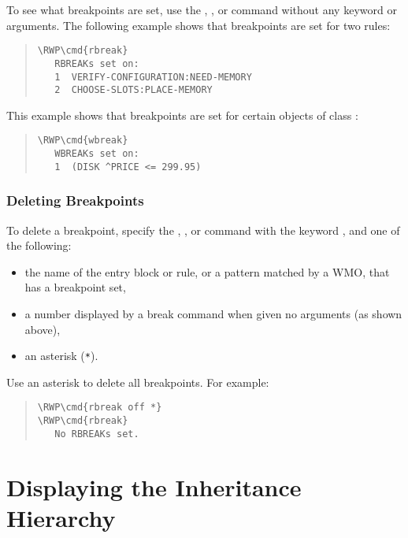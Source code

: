 To see what breakpoints are set, use the , , or
 command without any keyword or arguments. The following
example shows that breakpoints are set for two rules:

\begin{quote}
\begin{Verbatim}[commandchars=\\\{\}]
\RWP\cmd{rbreak}
   RBREAKs set on:
   1  VERIFY-CONFIGURATION:NEED-MEMORY
   2  CHOOSE-SLOTS:PLACE-MEMORY
\end{Verbatim}
\end{quote}

This example shows that breakpoints are set for certain objects of
class :

\begin{quote}
\begin{Verbatim}[commandchars=\\\{\}]
\RWP\cmd{wbreak}
   WBREAKs set on:
   1  (DISK ^PRICE <= 299.95)
\end{Verbatim}
\end{quote}

\subsubsection{Deleting Breakpoints}

To delete a breakpoint, specify the , , or
 command with the keyword , and one of the following:

\begin{itemize}
\item the name of the entry block or rule, or a pattern matched by a
  WMO, that has a breakpoint set,
\item a number displayed by a break command when given no arguments
  (as shown above),
\item an asterisk (\verb|*|).
\end{itemize}

Use an asterisk to delete all breakpoints. For example:

\begin{quote}
\begin{Verbatim}[commandchars=\\\{\}]
\RWP\cmd{rbreak off *}
\RWP\cmd{rbreak}
   No RBREAKs set.
\end{Verbatim}
\end{quote}

\section{Displaying the Inheritance Hierarchy}

